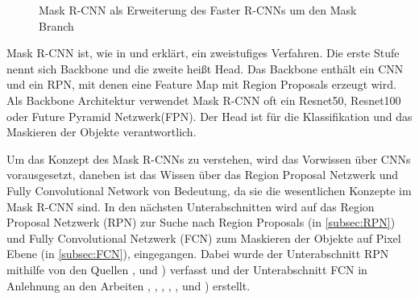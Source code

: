 \begin{figure}[H]
 \caption{Mask R-CNN als Erweiterung des Faster R-CNNs um den Mask Branch}
  \label{pic:mask_rcnn}
\end{figure}

Mask R-CNN ist, wie in \cite{7} und \cite{8} erklärt, ein zweistufiges Verfahren. Die erste Stufe nennt sich Backbone und die zweite heißt Head. Das Backbone enthält ein CNN und ein RPN, mit denen eine Feature Map mit Region Proposals erzeugt wird. Als Backbone Architektur verwendet Mask R-CNN oft ein Resnet50, Resnet100 oder Future Pyramid Netzwerk(FPN). Der Head ist für die Klassifikation und das Maskieren der Objekte verantwortlich.

Um das Konzept des Mask R-CNNs zu verstehen, wird das Vorwissen über CNNs vorausgesetzt, daneben ist das Wissen über das Region Proposal Netzwerk und Fully Convolutional Network von Bedeutung, da sie die wesentlichen Konzepte im Mask R-CNN sind. In den nächsten Unterabschnitten wird auf das Region Proposal Netzwerk (RPN) zur Suche nach Region Proposals (in \ref{subsec:RPN}) und Fully Convolutional Netzwerk (FCN) zum Maskieren der Objekte auf Pixel Ebene (in \ref{subsec:FCN}), eingegangen. Dabei wurde der Unterabschnitt RPN mithilfe von den Quellen \cite{9}, \cite{10} und \cite{11}) verfasst und der Unterabschnitt FCN in Anlehnung an den Arbeiten \cite{12}, \cite{13}, \cite{17}, \cite{18}, \cite{19}, \cite{20} und \cite{21}) erstellt.


